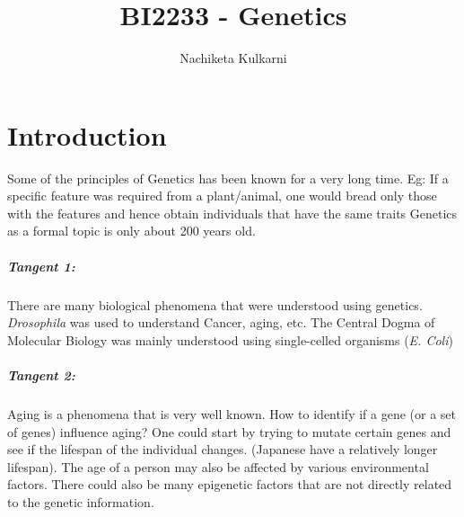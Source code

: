 \documentclass[12pt, oneside]{book}
\date{}
\title{BI2233 - Genetics}
\author{Nachiketa Kulkarni}
\begin{document}
\maketitle
\tableofcontents

\mainmatter
\chapter{Introduction}
Some of the principles of Genetics has been known for a very long time.
Eg: If a specific feature was required from a plant/animal, one would bread only those with the features and hence obtain individuals that have the same traits
Genetics as a formal topic is only about 200 years old.

\paragraph{Tangent 1:} There are many biological phenomena that were understood using genetics.
\textit{Drosophila} was used to understand Cancer, aging, etc.
The Central Dogma of Molecular Biology was mainly understood using single-celled organisms (\textit{E. Coli}) 

\paragraph{Tangent 2:}Aging is a phenomena that is very well known.
How to identify if a gene (or a set of genes) influence aging?
One could start by trying to mutate certain genes and see if the lifespan of the individual changes.
(Japanese have a relatively longer lifespan).
The age of a person may also be affected by various environmental factors.
There could also be many epigenetic factors that are not directly related to the genetic information.
\end{document}
